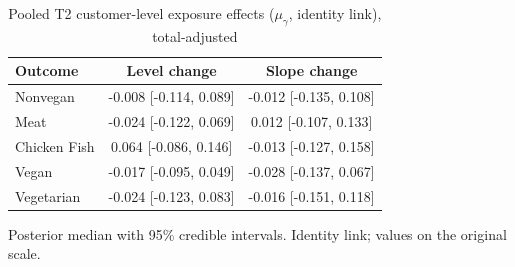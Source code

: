 \begin{table}[H]
\centering
\caption{Pooled T2 customer-level exposure effects ($\mu_\gamma$, identity link), total-adjusted}
\label{tab:a5_t2_mu_gamma_adj}
\begin{tabular}{lcc}
\toprule
Outcome & Level change & Slope change \\
\midrule
Nonvegan & -0.008 [-0.114, 0.089] & -0.012 [-0.135, 0.108] \\
Meat & -0.024 [-0.122, 0.069] & 0.012 [-0.107, 0.133] \\
Chicken Fish & 0.064 [-0.086, 0.146] & -0.013 [-0.127, 0.158] \\
Vegan & -0.017 [-0.095, 0.049] & -0.028 [-0.137, 0.067] \\
Vegetarian & -0.024 [-0.123, 0.083] & -0.016 [-0.151, 0.118] \\
\bottomrule
\end{tabular}
\par\smallskip\footnotesize Posterior median with 95\% credible intervals. Identity link; values on the original scale.
\end{table}
